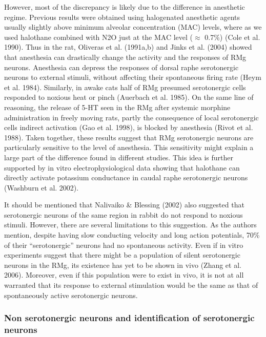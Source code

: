 \documentclass[a4paper,12pt,twoside]{report}
\begin{document}
However, most of the discrepancy is likely due to the difference in anesthetic regime. Previous results were obtained using halogenated anesthetic agents usually slightly above minimum alveolar concentration (MAC) levels, where as we used halothane combined with N2O just at the MAC level ($\approx$ 0.7\%) (Cole et al. 1990). Thus in the rat, Oliveras et al. (1991a,b) and Jinks et al. (2004) showed that anesthesia can drastically change the activity and the responses of RMg neurons. Anesthesia can depress the responses of dorsal raphe serotonergic neurons to external stimuli, without affecting their spontaneous firing rate (Heym et al. 1984). Similarly, in awake cats half of RMg presumed serotonergic cells responded to noxious heat or pinch (Auerbach et al. 1985). On the same line of reasoning, the release of 5-HT seen in the RMg after systemic morphine administration in freely moving rats, partly the consequence of local serotonergic cells indirect activation (Gao et al. 1998), is blocked by anesthesia (Rivot et al. 1988). Taken together, these results suggest that RMg serotonergic neurons are particularly sensitive to the level of anesthesia. This sensitivity might explain a large part of the difference found in different studies. This idea is further supported by in vitro electrophysiological data showing that halothane can directly activate potassium conductance in caudal raphe serotonergic neurons (Washburn et al. 2002).

It should be mentioned that Nalivaiko \& Blessing (2002) also suggested that serotonergic neurons of the same region in rabbit do not respond to noxious stimuli. However, there are several limitations to this suggestion. As the authors mention, despite having slow conducting velocity and long action potentials, 70\% of their “serotonergic” neurons had no spontaneous activity. Even if in vitro experiments suggest that there might be a population of silent serotonergic neurons in the RMg, its existence has yet to be shown in vivo (Zhang et al. 2006). Moreover, even if this population were to exist in vivo, it is not at all warranted that its response to external stimulation would be the same as that of spontaneously active serotonergic neurons.

\subsubsection{Non serotonergic neurons and identification of serotonergic neurons}
\end{document}
